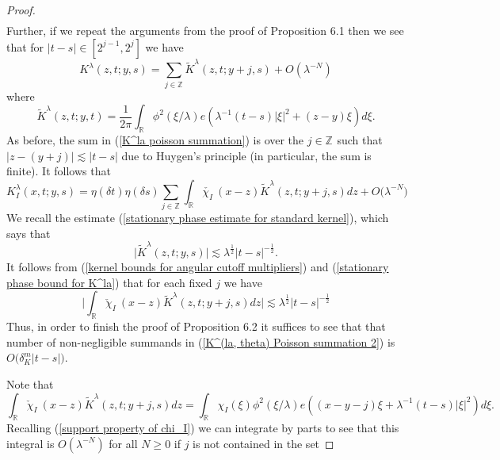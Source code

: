 \documentclass[10pt,a4paper]{amsart}
\newcommand{\Z}[1][]{\mathbb{Z}^#1}
\newcommand{\dK}[1]{\delta_{K}^{#1}}
\newcommand{\la}{\lambda}
\begin{document}
\begin{proof}
\begin{equation}
\begin{split}
\end{split}
\end{equation}
Further, if we repeat the arguments from the proof of Proposition 6.1 then we see that for $|t-s| \in [2^{j-1}, 2^j]$ we have
\begin{equation} \label{K^la poisson summation}
    K^{\la}(z,t; y, s) = \sum_{j \in \Z{}}\tilde{K}^{\la}(z,t;y+j,s) + O(\la^{-N})
\end{equation}
where
\begin{equation} \label{tilde K^la definition} 
    \tilde{K}^{\la}(z,t; y, t) = \frac{1}{2\pi} \int_{\mathbb{R}} \phi^2(\xi/\la)e(\la^{-1}(t-s)|\xi|^2 + (z-y) \xi)d\xi.
\end{equation}
As before, the sum in (\ref{K^la poisson summation}) is over the $j \in \Z{}$ such that $|z - (y + j)| \lesssim |t-s|$ due to Huygen's principle (in particular, the sum is finite). It follows that 
\begin{equation} \label{K^(la, theta) Poisson summation 2}
    K^{\la}_{I} (x,t;y,s) = \eta(\delta t) \eta(\delta s) \sum_{j \in \Z{}}\int_{\mathbb{R}} \check{\chi_{I}} \ (x - z)\tilde{K}^{\la}(z,t; y+ j, s) dz + O\big(\la^{-N}\big)
\end{equation}
We recall the estimate (\ref{stationary phase estimate for standard kernel}), which says that 
\begin{equation} \label{stationary phase bound for K^la}
    \big| \tilde{K}^{\la}(z,t;y,s)\big| \lesssim \la^{\frac{1}{2}}|t-s|^{-\frac{1}{2}}.
\end{equation}
It follows from (\ref{kernel bounds for angular cutoff multipliers}) and (\ref{stationary phase bound for K^la}) that for each fixed $j$ we have
\begin{equation}
    \Big|\int_{\mathbb{R}} \check{\chi}_{I} \ (x - z)\tilde{K}^{\la}(z,t; y+ j, s) dz\Big| \lesssim \la^{\frac{1}{2}}|t-s|^{-\frac{1}{2}}
\end{equation}
Thus, in order to finish the proof of Proposition 6.2 it suffices to see that that number of non-negligible summands in (\ref{K^(la, theta) Poisson summation 2}) is $O\big(\dK{m}|t-s|\big)$.
\par
Note that 
\begin{equation}
    \int_{\mathbb{R}} \check{\chi}_{I} \ (x - z)\tilde{K}^{\la}(z,t; y+ j, s) dz = \int_{\mathbb{R}} \chi_{I}(\xi)\phi^2(\xi/\la)e(( x-y-j) \xi + \la^{-1}(t-s)|\xi|^2)d\xi.
\end{equation}
Recalling (\ref{support property of chi_I}) we can integrate by parts to see that this integral is $O(\la^{-N})$ for all $N \geq 0$ if $j$ is not contained in the set

\end{proof}
\end{document}
